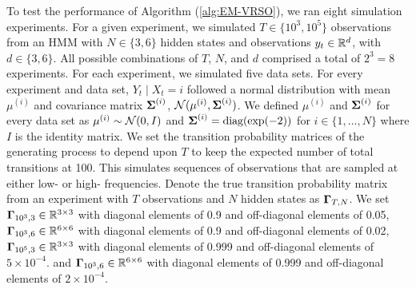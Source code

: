 To test the performance of Algorithm (\ref{alg:EM-VRSO}), we ran eight simulation experiments. For a given experiment, we simulated $T \in \{10^3,10^5\}$ observations from an HMM with $N \in \{3,6\}$ hidden states and observations $y_t \in \mathbb{R}^d$, with $d \in \{3,6\}$. All possible combinations of $T$, $N$, and $d$ comprised a total of $2^3 = 8$ experiments. For each experiment, we simulated five data sets. For every experiment and data set, $Y_t \mid X_t = i$ followed a normal distribution with mean $\mu^{(i)}$ and covariance matrix $\boldsymbol{\Sigma}^{(i)}$, $\mathcal{N}(\mu^{(i)},\boldsymbol{\Sigma}^{(i)})$. We defined $\mu^{(i)}$ and $\boldsymbol{\Sigma}^{(i)}$ for every data set as
%
$\mu^{(i)} \sim \mathcal{N}(0,I)$ and $\boldsymbol{\Sigma}^{(i)} = \text{diag}(\exp(-2))$ for $i \in \{1,\ldots,N\}$
%
where $I$ is the identity matrix.
%
We set the transition probability matrices of the generating process to depend upon $T$ to keep the expected number of total transitions at 100. This simulates sequences of observations that are sampled at either low- or high- frequencies.
%
Denote the true transition probability matrix from an experiment with $T$ observations and $N$ hidden states as $\boldsymbol{\Gamma}_{T,N}$. We set $\boldsymbol{\Gamma}_{10^3,3} \in \mathbb{R}^{3 \times 3}$ with diagonal elements of 0.9 and off-diagonal elements of 0.05, $\boldsymbol{\Gamma}_{10^3,6} \in \mathbb{R}^{6 \times 6}$ with diagonal elements of 0.9 and off-diagonal elements of 0.02, $\boldsymbol{\Gamma}_{10^5,3} \in \mathbb{R}^{3 \times 3}$ with diagonal elements of 0.999 and off-diagonal elements of $5 \times 10^{-4}$. and $\boldsymbol{\Gamma}_{10^3,6} \in \mathbb{R}^{6 \times 6}$ with diagonal elements of 0.999 and off-diagonal elements of $2 \times 10^{-4}$. 
%
\iffalse
